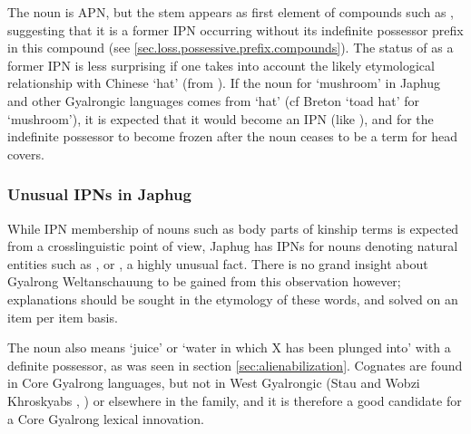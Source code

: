 The noun  is APN, but the stem  appears as first element of compounds such as , suggesting that it is a former IPN occurring without its indefinite possessor prefix in this compound (see \ref{sec.loss.possessive.prefix.compounds}). The status of  as a former IPN is less surprising if one takes into account the likely etymological relationship with Chinese   `hat' (from ).  If the noun for `mushroom' in Japhug and other Gyalrongic languages comes from `hat' (cf Breton  `toad hat' for `mushroom'), it is expected that it would become an IPN (like ), and for the indefinite possessor  to become frozen after the noun ceases to be a term for head covers.
 
\subsubsection{Unusual IPNs in Japhug} \label{sec:earth.IPN}
While IPN membership of nouns such as body parts of kinship terms is expected from a crosslinguistic point of view, Japhug has IPNs for nouns denoting natural entities such as ,  or , a highly unusual fact. There is no grand insight about Gyalrong Weltanschauung to be gained from this observation however; explanations should be sought in the etymology of these words, and solved on an item per item basis.  

The noun  also means `juice' or `water in which X has been plunged into' with a definite possessor, as was seen in section \ref{sec:alienabilization}. Cognates are found in Core Gyalrong languages, but not in West Gyalrongic (Stau  and Wobzi Khroskyabs , \citealt[610]{jacques17stau}) or elsewhere in the family, and it is therefore a good candidate for a Core Gyalrong lexical innovation. 

